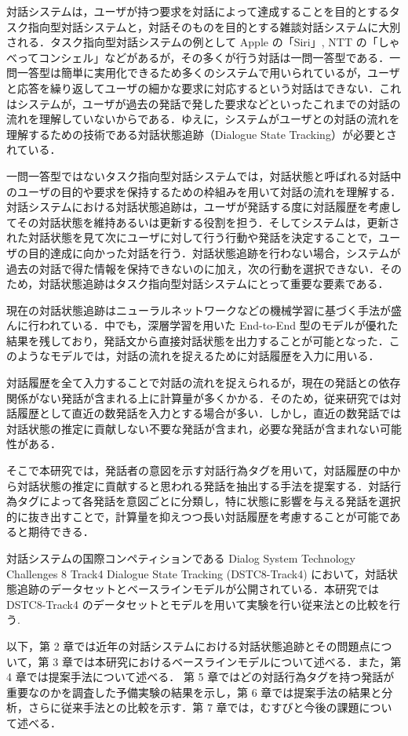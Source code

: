対話システムは，ユーザが持つ要求を対話によって達成することを目的とするタスク指向型対話システムと，対話そのものを目的とする雑談対話システムに大別される．タスク指向型対話システムの例として Apple の「Siri」, NTT の「しゃべってコンシェル」などがあるが，その多くが行う対話は一問一答型である．一問一答型は簡単に実用化できるため多くのシステムで用いられているが，ユーザと応答を繰り返してユーザの細かな要求に対応するという対話はできない．これはシステムが，ユーザが過去の発話で発した要求などといったこれまでの対話の流れを理解していないからである．ゆえに，システムがユーザとの対話の流れを理解するための技術である対話状態追跡（Dialogue State Tracking）が必要とされている．\par
一問一答型ではないタスク指向型対話システムでは，対話状態と呼ばれる対話中のユーザの目的や要求を保持するための枠組みを用いて対話の流れを理解する．対話システムにおける対話状態追跡は，ユーザが発話する度に対話履歴を考慮してその対話状態を維持あるいは更新する役割を担う．そしてシステムは，更新された対話状態を見て次にユーザに対して行う行動や発話を決定することで，ユーザの目的達成に向かった対話を行う．対話状態追跡を行わない場合，システムが過去の対話で得た情報を保持できないのに加え，次の行動を選択できない．そのため，対話状態追跡はタスク指向型対話システムにとって重要な要素である．
\par
現在の対話状態追跡はニューラルネットワークなどの機械学習に基づく手法が盛んに行われている．中でも，深層学習を用いた End-to-End 型のモデル\cite{nbt,e2e}が優れた結果を残しており，発話文から直接対話状態を出力することが可能となった．このようなモデルでは，対話の流れを捉えるために対話履歴を入力に用いる．
\par
対話履歴を全て入力することで対話の流れを捉えられるが，現在の発話との依存関係がない発話が含まれる上に計算量が多くかかる．そのため，従来研究では対話履歴として直近の数発話を入力とする場合が多い．しかし，直近の数発話では対話状態の推定に貢献しない不要な発話が含まれ，必要な発話が含まれない可能性がある．
\par
そこで本研究では，発話者の意図を示す対話行為タグを用いて，対話履歴の中から対話状態の推定に貢献すると思われる発話を抽出する手法を提案する．対話行為タグによって各発話を意図ごとに分類し，特に状態に影響を与える発話を選択的に抜き出すことで，計算量を抑えつつ長い対話履歴を考慮することが可能であると期待できる．
\par
対話システムの国際コンペティションである  Dialog System Technology Challenges 8 Track4 Dialogue State Tracking (DSTC8-Track4)\cite{dstc8} において，対話状態追跡のデータセットとベースラインモデルが公開されている．本研究では DSTC8-Track4 のデータセットとモデルを用いて実験を行い従来法との比較を行う.\par
以下，第 2 章では近年の対話システムにおける対話状態追跡とその問題点について，第 3 章では本研究におけるベースラインモデルについて述べる．また，第 4 章では提案手法について述べる．
第 5 章ではどの対話行為タグを持つ発話が重要なのかを調査した予備実験の結果を示し，第 6 章では提案手法の結果と分析，さらに従来手法との比較を示す．第 7 章では，むすびと今後の課題について述べる．
